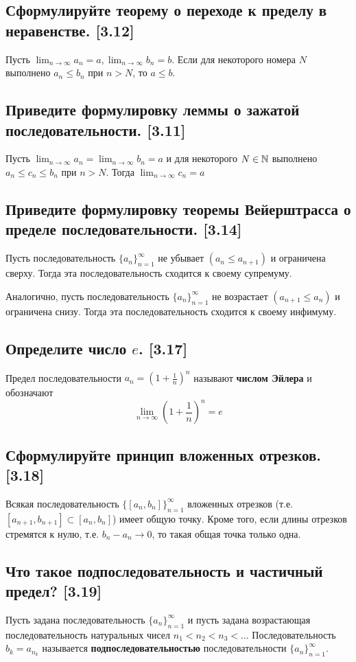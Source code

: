 \documentclass[12pt, a4paper]{article}
\begin{document}
    \subsection{Сформулируйте теорему о переходе к пределу в неравенстве. [3.12]}
    Пусть $ \lim_{n \to \infty} a_n = a,  \lim_{n \to \infty} b_n = b$. Если для некоторого номера $N$ выполнено $a_n \leq b_n$ при $n > N$, то $a \leq b$.
    \subsection{Приведите формулировку леммы о зажатой последовательности. [3.11]}
    Пусть $ \lim_{n \to \infty} a_n =  \lim_{n \to \infty} b_n = a$ и для некоторого $N \in \mathbb{N}$ выполнено $a_n \leq c_n \leq b_n$ при $n > N$. Тогда $ \lim_{n \to \infty} c_n = a$
    \subsection{Приведите формулировку теоремы Вейерштрасса о пределе последовательности. [3.14]} 
    Пусть последовательность $\{a_n\}^{\infty}_{n=1}$ не убывает $(a_n \leq a_{n + 1})$ и ограничена сверху. Тогда эта последовательность сходится к своему супремуму.

    Аналогично, пусть последовательность $\{a_n\}^{\infty}_{n=1}$ не возрастает $(a_{n+1} \leq a_n)$ и ограничена снизу. Тогда эта последовательность сходится к своему инфимуму.
    \subsection{Определите число $e$. [3.17]}
    Предел последовательности $a_n = \left(1 + \frac{1}{n}\right)^n$ называют \textbf{числом Эйлера} и обозначают
    \begin{equation*}
         \lim_{n \to \infty} \left(1 + \frac{1}{n}\right)^n = e
    \end{equation*}
    \subsection{Сформулируйте принцип вложенных отрезков. [3.18]}
    Всякая последовательность $\{[a_n, b_n]\}^{\infty}_{n=1}$ вложенных отрезков (т.е. $[a_{n + 1}, b_{n + 1}] \subset [a_n, b_n]$) имеет общую точку. Кроме того, если длины отрезков стремятся к нулю, т.е. $b_n - a_n \to 0$, то такая общая точка только одна.
    \subsection{Что такое подпоследовательность и частичный предел? [3.19]}
    Пусть задана последовательность $\{a_n\}^{\infty}_{n=1}$ и пусть задана возрастающая последовательность натуральных чисел $n_1 < n_2 < n_3 < \dots$ Последовательность $b_k = a_{n_k}$ называется \textbf{подпоследовательностью} последовательности $\{a_n\}^{\infty}_{n=1}$.
\end{document}
